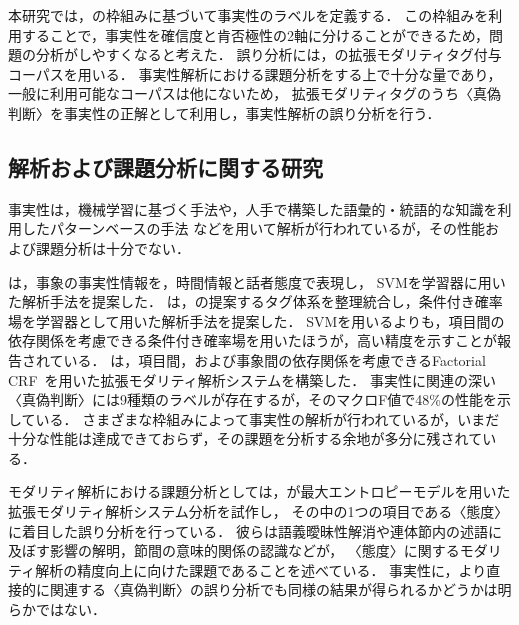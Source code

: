 \documentclass[japanese]{jnlp_1.4}
\begin{document}
本研究では，の枠組みに基づいて事実性のラベルを定義する．
この枠組みを利用することで，事実性を確信度と肯否極性の2軸に分けることができるため，問題の分析がしやすくなると考えた．
誤り分析には，の拡張モダリティタグ付与コーパスを用いる．
事実性解析における課題分析をする上で十分な量であり，一般に利用可能なコーパスは他にないため，
拡張モダリティタグのうち〈真偽判断〉を事実性の正解として利用し，事実性解析の誤り分析を行う．


\subsection{解析および課題分析に関する研究}
\label{subsec_method}

事実性は，機械学習に基づく手法や，人手で構築した語彙的・統語的な知識を利用したパターンベースの手法
などを用いて解析が行われているが，その性能および課題分析は十分でない．

は，事象の事実性情報を，時間情報と話者態度で表現し，
SVMを学習器に用いた解析手法を提案した．
は，の提案するタグ体系を整理統合し，条件付き確率場を学習器として用いた解析手法を提案した．
SVMを用いるよりも，項目間の依存関係を考慮できる条件付き確率場を用いたほうが，高い精度を示すことが報告されている．
は，項目間，および事象間の依存関係を考慮できるFactorial CRF~\cite{Sutton2007}を用いた拡張モダリティ解析システムを構築した．
事実性に関連の深い〈真偽判断〉には9種類のラベルが存在するが，そのマクロF値で48\%の性能を示している．
さまざまな枠組みによって事実性の解析が行われているが，いまだ十分な性能は達成できておらず，その課題を分析する余地が多分に残されている．

モダリティ解析における課題分析としては，が最大エントロピーモデルを用いた拡張モダリティ解析システム分析を試作し，
その中の1つの項目である〈態度〉に着目した誤り分析を行っている．
彼らは語義曖昧性解消や連体節内の述語に及ぼす影響の解明，節間の意味的関係の認識などが，
〈態度〉に関するモダリティ解析の精度向上に向けた課題であることを述べている．
事実性に，より直接的に関連する〈真偽判断〉の誤り分析でも同様の結果が得られるかどうかは明らかではない．
\end{document}
